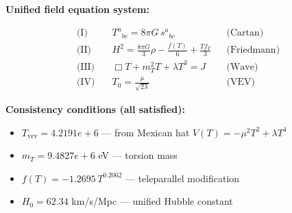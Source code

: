 
\textbf{Unified field equation system:}

\begin{align}
  \text{(I)} \quad & T^a{}_{bc} = 8\pi G \, s^a{}_{bc} && \text{(Cartan)} \\
  \text{(II)} \quad & H^2 = \frac{8\pi G}{3}\rho - \frac{f(T)}{6} + \frac{Tf_T}{3} && \text{(Friedmann)} \\
  \text{(III)} \quad & \Box T + m_T^2 T + \lambda T^3 = J && \text{(Wave)} \\
  \text{(IV)} \quad & T_0 = \frac{\mu}{\sqrt{2\lambda}} && \text{(VEV)}
\end{align}

\textbf{Consistency conditions (all satisfied):}
\begin{itemize}
  \item $T_{\text{vev}} = 4.2191e+6$ — from Mexican hat $V(T) = -\mu^2 T^2 + \lambda T^4$
  \item $m_T = 9.4827e+6$ eV — torsion mass
  \item $f(T) = -1.2695 \, T^{0.2062}$ — teleparallel modification
  \item $H_0 = 62.34$ km/s/Mpc — unified Hubble constant
\end{itemize}